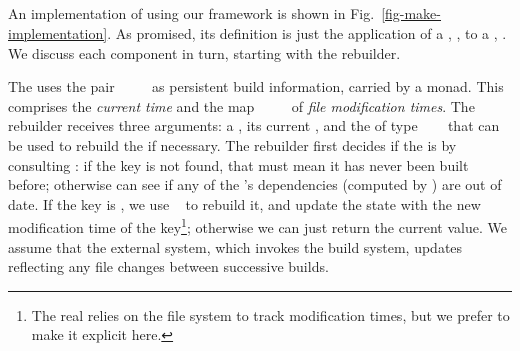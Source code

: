 \subsection{\Make}\label{sec-implementation-make}

An implementation of \Make using our framework is shown in
Fig.~\ref{fig-make-implementation}. As promised, its definition
is just the application of a , ,
to a , .
We discuss each component in turn, starting with the rebuilder.

The  uses the pair
~~\hs{=}~~ as persistent
build information, carried by a  monad. This
 comprises the \emph{current time}  and the map
~\hs{::}~~~ of \emph{file
modification times}. The rebuilder receives three arguments: a
, its current , and the  of type
~~~ that can be used to rebuild
the  if necessary.  The rebuilder first decides if the
 is  by consulting : if the key is not
found, that must mean it has never been built before; otherwise
 can see if any of the 's dependencies
(computed by ) are out of date. If the key is
, we use ~ to rebuild it, and update the state with
the new modification time of the key\footnote{The real \Make
relies on the file system to track modification times, but we prefer
to make it explicit here.}; otherwise we can just return the current value.
We assume that the external system, which invokes the build system, updates
~ reflecting any file changes between successive builds.

